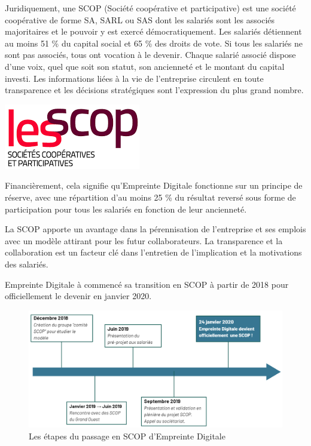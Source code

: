\documentclass[12pt]{article}
\begin{document}
\noindent%
\begin{minipage}{.7\textwidth}%
Juridiquement, une \gls{SCOP} (Société coopérative et participative) est une société coopérative de forme \gls{SA}, \gls{SARL} ou \gls{SAS} dont les salariés sont les associés majoritaires et le pouvoir y est exercé démocratiquement.
Les salariés détiennent au moins 51 \% du capital social et 65 \% des droits de vote. 
Si tous les salariés ne sont pas associés, tous ont vocation à le devenir. 
Chaque salarié associé dispose d’une voix, quel que soit son statut, son ancienneté et le montant du capital investi.
Les informations liées à la vie de l’entreprise circulent en toute transparence et les décisions stratégiques sont l’expression du plus grand nombre. \cite{Scop} \\
\end{minipage}%
\hfill
\begin{minipage}{.3\textwidth}%
\begin{center}
    \includegraphics[scale=0.7]{src/logo_scop.png}
\end{center}
\end{minipage}%

Financièrement, cela signifie qu'Empreinte Digitale fonctionne sur un principe de réserve, avec une répartition d'au moins 25 \% du résultat reversé sous forme de participation pour tous les salariés en fonction de leur ancienneté.

La \gls{SCOP} apporte un avantage dans la pérennisation de l'entreprise et ses emplois avec un modèle attirant pour les futur collaborateurs. 
La transparence et la collaboration est un facteur clé dans l'entretien de l'implication et la motivations des salariés.

Empreinte Digitale à commencé sa transition en \gls{SCOP} à partir de 2018 pour officiellement le devenir en janvier 2020.
\begin{figure}[!ht]
    \centering
    \includegraphics[width=\textwidth]{src/graph_scop.png}
    \caption{Les étapes du passage en \gls{SCOP} d'Empreinte Digitale}
    \label{fig:transition_scop}
\end{figure}
\end{document}
